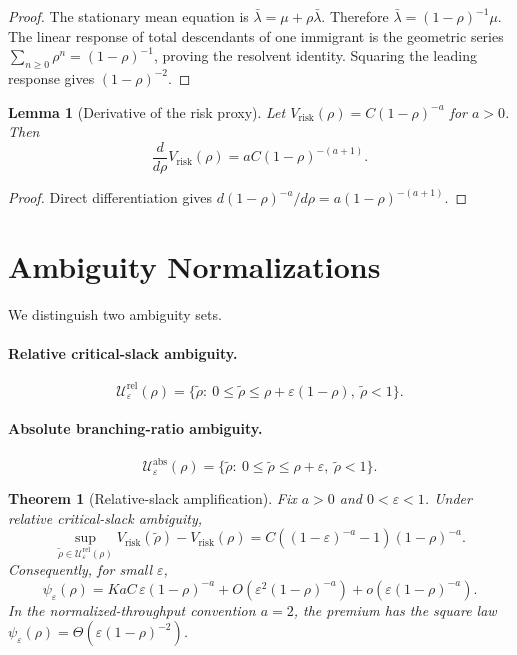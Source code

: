 \documentclass[11pt]{article}
\newtheorem{lemma}{Lemma}
\newtheorem{theorem}{Theorem}
\newcommand{\eps}{\varepsilon}
\begin{document}
\begin{proof}
The stationary mean equation is
$\bar\lambda=\mu+\rho\bar\lambda$. Therefore
$\bar\lambda=(1-\rho)^{-1}\mu$. The linear response of total descendants of one
immigrant is the geometric series $\sum_{n\ge0}\rho^n=(1-\rho)^{-1}$, proving
the resolvent identity. Squaring the leading response gives
$(1-\rho)^{-2}$.
\end{proof}

\begin{lemma}[Derivative of the risk proxy]
Let $V_{\mathrm{risk}}(\rho)=C(1-\rho)^{-a}$ for $a>0$. Then
\[
\frac{d}{d\rho}V_{\mathrm{risk}}(\rho)
=aC(1-\rho)^{-(a+1)}.
\]
\end{lemma}

\begin{proof}
Direct differentiation gives
$d(1-\rho)^{-a}/d\rho=a(1-\rho)^{-(a+1)}$.
\end{proof}

\section{Ambiguity Normalizations}

We distinguish two ambiguity sets.

\paragraph{Relative critical-slack ambiguity.}
\[
\mathcal U^{\mathrm{rel}}_\eps(\rho)
=\{\tilde\rho:\ 0\le \tilde\rho\le \rho+\eps(1-\rho),\ \tilde\rho<1\}.
\]

\paragraph{Absolute branching-ratio ambiguity.}
\[
\mathcal U^{\mathrm{abs}}_\eps(\rho)
=\{\tilde\rho:\ 0\le \tilde\rho\le \rho+\eps,\ \tilde\rho<1\}.
\]

\begin{theorem}[Relative-slack amplification]
Fix $a>0$ and $0<\eps<1$. Under relative critical-slack ambiguity,
\[
\sup_{\tilde\rho\in\mathcal U^{\mathrm{rel}}_\eps(\rho)}
V_{\mathrm{risk}}(\tilde\rho)-V_{\mathrm{risk}}(\rho)
=C\left((1-\eps)^{-a}-1\right)(1-\rho)^{-a}.
\]
Consequently, for small $\eps$,
\[
\psi_\eps(\rho)
=KaC\,\eps(1-\rho)^{-a}+O(\eps^2(1-\rho)^{-a})+o(\eps(1-\rho)^{-a}).
\]
In the normalized-throughput convention $a=2$, the premium has the square law
$\psi_\eps(\rho)=\Theta(\eps(1-\rho)^{-2})$.
\end{theorem}
\end{document}
